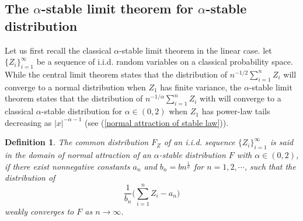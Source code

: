 \documentclass[a4paper,oneside,10pt]{article}%
\newtheorem{definition}[theorem]{Definition}
\numberwithin{equation}{section}
\begin{document}


\subsection{The $\alpha$-stable limit theorem for $\alpha$-stable
distribution}

Let us first recall the classical $\alpha$-stable limit theorem in the linear
case. let $\{Z_{i}\}_{i=1}^{\infty}$ be a sequence of i.i.d. random variables
on a classical probability space. While the central limit theorem states that
the distribution of $n^{-1/2}\sum_{i=1}^{n}Z_{i}$ will converge to a normal
distribution when $Z_{1}$ has finite variance, the $\alpha$-stable limit
theorem states that the distribution of $n^{-1/\alpha}\sum_{i=1}^{n}Z_{i}$
with will converge to a classical $\alpha$-stable distribution for $\alpha
\in(0,2)$ when $Z_{1}$ has power-law tails decreasing as ${|x|^{-\alpha-1}}$
(see (\ref{normal attraction of stable law})).

\begin{definition}
The common distribution $F_{Z}$ of an i.i.d. sequence $\{Z_{i}\}_{i=1}%
^{\infty}$ is said in the domain of normal attraction of an $\alpha$-stable
distribution $F$ with $\alpha \in(0,2)$, if there exist nonnegative constants
$a_{n}$ and $b_{n}=bn^{\frac{1}{\alpha}}$ for $n=1,2,\cdots$, such that the
distribution of
\[
\frac{1}{b_{n}}\bigg(\sum_{i=1}^{n}Z_{i}-a_{n}\bigg)
\]
weakly converges to $F$ as $n\rightarrow \infty$.


\end{definition}
\end{document}
